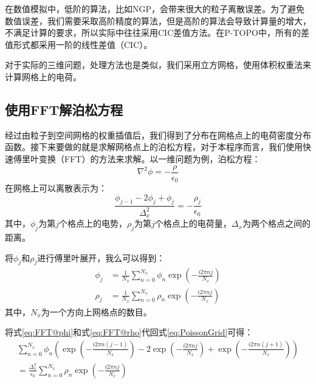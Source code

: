 {在数值模拟中，低阶的算法，比如NGP，会带来很大的粒子离散误差。为了避免数值误差，我们需要采取高阶精度的算法，但是高阶的算法会导致计算量的增大，不满足计算的要求，所以实际中往往采用CIC差值方法。在P-TOPO中，所有的差值形式都采用一阶的线性差值（CIC）。

对于实际的三维问题，处理方法也是类似，我们采用立方网格，使用体积权重法来计算网格上的电荷。

\subsection{使用FFT解泊松方程}
\label{section:PIC_FFT}
经过由粒子到空间网格的权重插值后，我们得到了分布在网格点上的电荷密度分布函数。接下来要做的就是求解网格点上的泊松方程，对于本程序而言，我们使用快速傅里叶变换（FFT）的方法来求解。以一维问题为例，泊松方程：
\begin{equation}\label{eq:Poisson}
\nabla^2 \phi = -\frac{\rho}{\epsilon _0}
\end{equation}
在网格上可以离散表示为：
\begin{equation}\label{eq:PoissonGrid}
\frac{\phi_{j-1}-2\phi_{j}+\phi_{j}}{\Delta _{x}^{2}}=-\frac{\rho _j}{\epsilon _0}
\end{equation}
其中，$\phi_{j}$为第$j$个格点上的电势，$\rho_{j}$为第$j$个格点上的电荷量，$\Delta _{x}$为两个格点之间的距离。

将$\phi_{j}$和$\rho_{j}$进行傅里叶展开，我么可以得到：
\begin{align}
\label{eq:FFT@phi}
\phi _j &= \frac{1}{N_x} \sum_{n=0}^{N_x}{\phi_n \exp{(-\frac{i2 \pi n j}{N_x} )}} \\
\label{eq:FFT@rho}
\rho _j &= \frac{1}{N_x} \sum_{n=0}^{N_x}{\rho_n \exp{(-\frac{i2 \pi n j}{N_x} )}}
\end{align}
其中，$N_x$为一个方向上网格点的数目。

将式\ref{eq:FFT@phi}和式\ref{eq:FFT@rho}代回式\ref{eq:PoissonGrid}可得：
\begin{equation}\label{eq:FFT@PIC2}
\begin{aligned}
\sum_{n=0}^{N_x}{\phi_n
\left(\exp{(-\frac{i2 \pi n (j-1)}{N_x} )}  -2\exp{(-\frac{i2 \pi n j}{N_x} )}  +  \exp{(-\frac{i2 \pi n (j+1)}{N_x} )}\right)} \\
= \frac{\Delta _{x}^{2}}{\epsilon _0} \sum_{n=0}^{N_x}{\rho_n \exp{(-\frac{i2 \pi n j}{N_x} )}} \qquad\qquad\qquad
\end{aligned}
\end{equation}

}
